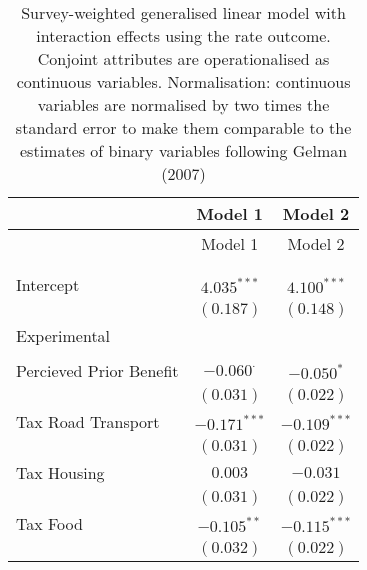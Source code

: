 
\begin{center}
\begin{tiny}
\begin{longtable}{l@{} c@{} c@{}}
\hline
 & Model 1 & Model 2 \\
\hline
\endfirsthead
\hline
 & Model 1 & Model 2 \\
\hline
\endhead
\hline
\endfoot
\hline
\multicolumn{3}{l}{\tiny{$^{***}p<0.001$; $^{**}p<0.01$; $^{*}p<0.05$; $^{\cdot}p<0.1$}}\\
\caption{Survey-weighted generalised linear model with interaction effects using the rate outcome. Conjoint attributes are operationalised as continuous variables. Normalisation: continuous variables are normalised by two times 
               the standard error to make them comparable to the estimates of binary variables following Gelman (2007)}
\label{table:weighted_interactions_exp_continous}
\endlastfoot \\
Intercept                                              & $4.035^{***}$    & $4.100^{***}$    \\
                                                       & $(0.187)$        & $(0.148)$        \\
Experimental                                           &                  &                  \\
                                                       &                  &                  \\
\quad Percieved Prior Benefit                          & $-0.060^{\cdot}$ & $-0.050^{*}$     \\
                                                       & $(0.031)$        & $(0.022)$        \\
\quad Tax Road Transport                               & $-0.171^{***}$   & $-0.109^{***}$   \\
                                                       & $(0.031)$        & $(0.022)$        \\
\quad Tax Housing                                      & $0.003$          & $-0.031$         \\
                                                       & $(0.031)$        & $(0.022)$        \\
\quad Tax Food                                         & $-0.105^{**}$    & $-0.115^{***}$   \\
                                                       & $(0.032)$        & $(0.022)$        \\

\end{longtable}
\end{tiny}
\end{center}
